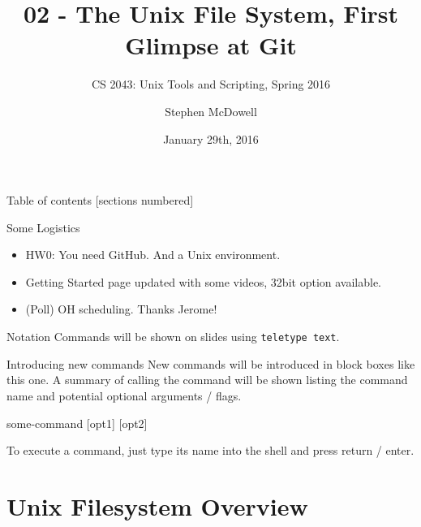 \documentclass[11pt]{beamer}
\title{02 \-- The Unix File System, First Glimpse at Git}
\subtitle{CS 2043: Unix Tools and Scripting, Spring 2016 \cite{prevSemesters}}
\date{January 29th, 2016}
\author{Stephen McDowell}
\institute{Cornell University}
\begin{document}
\maketitle

\begin{frame}{Table of contents}
  [sections numbered]
  \tableofcontents[hideallsubsections]
\end{frame}

\begin{frame}{Some Logistics}
  \begin{itemize}[<+- | alert@+>]
    \item \alert<4>{HW0: You need GitHub.  And a Unix environment.}
    \item Getting Started page updated with some videos, 32bit option available.
    \item (Poll) OH scheduling.  Thanks Jerome!
  \end{itemize}
\end{frame}

\begin{frame}[fragile]{Notation}
  Commands will be shown on slides using \texttt{teletype text}.

  \begin{block}{Introducing new commands}
    New commands will be introduced in block boxes like this one.  A summary of calling the command will
    be shown listing the command name and potential optional arguments / flags.

    \begin{center}
      some-command [opt1] [opt2]
    \end{center}
    \vspace*{1em}
  \end{block}

  To execute a command, just type its name into the shell and press return / enter.
\end{frame}

%
\section{Unix Filesystem Overview}
\label{sec:unix_filesystem_overview}
\end{document}
